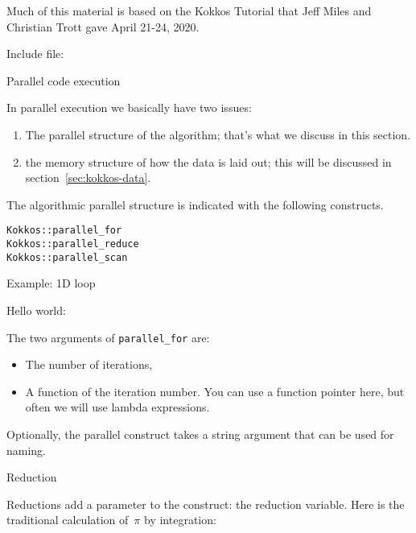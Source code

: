 
Much of this material is based on the 
Kokkos Tutorial
that 
Jeff Miles and Christian Trott
gave
April 21-24, 2020.

Include file:

 {Parallel code execution}

In parallel execution we basically have two issues:
\begin{enumerate}
\item The parallel structure of the algorithm;
  that's what we discuss in this section.
\item the memory structure of how the data is laid out;
  this will be discussed in section~\ref{sec:kokkos-data}.
\end{enumerate}

The algorithmic parallel structure is indicated with the following constructs.
\begin{lstlisting}
Kokkos::parallel_for
Kokkos::parallel_reduce
Kokkos::parallel_scan
\end{lstlisting}

 {Example: 1D loop}

Hello world:

The two arguments of \lstinline{parallel_for} are:
\begin{itemize}
\item The number of iterations,
\item A function of the iteration number.
  You can use a function pointer here, but often we will use lambda expressions.
\end{itemize}

Optionally, the parallel construct takes a string argument
that can be used for naming.

 {Reduction}

Reductions add a parameter to the construct: the reduction variable.
Here is the traditional calculation of~$\pi$ by integration:
%

